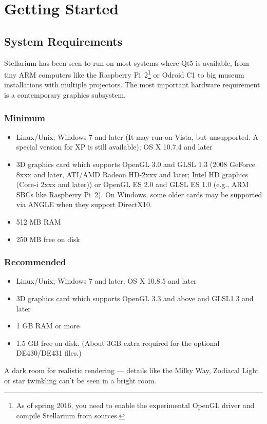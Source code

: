 

\chapter{Getting Started}
\label{ch:GettingStarted}

\section{System Requirements}
\label{sec:GettingStarted:SystemRequirements}

Stellarium has been seen to run on most systems where Qt5 is
available, from tiny ARM computers like the Raspberry Pi~2\footnote{As
  of spring 2016, you need to enable the experimental OpenGL driver
  and compile Stellarium from sources.} or Odroid C1 to big museum
installations with multiple projectors. The most important hardware
requirement is a contemporary graphics subsystem.


\subsection{Minimum}
\begin{itemize}
\item Linux/Unix; Windows 7 and later (It may run on Vista, but unsupported. A special version for XP is still available); OS X 10.7.4 and later
\item 3D graphics card which supports OpenGL 3.0 and GLSL 1.3 (2008
  GeForce 8xxx and later, ATI/AMD Radeon HD-2xxx and later; Intel HD
  graphics (Core-i 2xxx and later)) or OpenGL ES 2.0 and GLSL ES 1.0
  (e.g., ARM SBCs like Raspberry Pi~2). On Windows, some older cards
  may be supported via ANGLE when they support DirectX10.
\item 512 MB RAM
\item 250 MB free on disk
\end{itemize}

\subsection{Recommended}
\begin{itemize}
\item Linux/Unix; Windows 7 and later; OS X 10.8.5 and later
\item 3D graphics card which supports OpenGL 3.3 and above and GLSL1.3 and later
\item 1 GB RAM or more
\item 1.5 GB free on disk. (About 3GB extra required for the optional DE430/DE431 files.)
\end{itemize}
 A dark room for realistic rendering --- details like the Milky Way, Zodiacal Light or
star twinkling can't be seen in a bright room.


